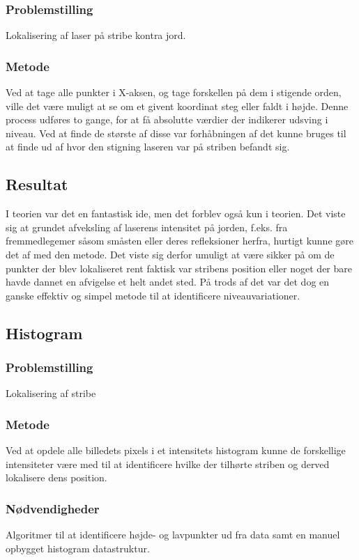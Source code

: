 \subsubsection{Problemstilling}
Lokalisering af laser på stribe kontra jord.

\subsubsection{Metode}
Ved at tage alle punkter i X-aksen, og tage forskellen på dem i stigende orden, ville det være muligt at se om et givent koordinat steg eller faldt i højde.
Denne process udføres to gange, for at få absolutte værdier der indikerer udsving i niveau. Ved at finde de største af disse var forhåbningen af det kunne bruges til at finde ud af hvor den stigning laseren var på striben befandt sig.

\subsection{Resultat}
I teorien var det en fantastisk ide, men det forblev også kun i teorien. Det viste sig at grundet afveksling af laserens intensitet på jorden, f.eks. fra fremmedlegemer såsom småsten eller deres refleksioner herfra, hurtigt kunne gøre det af med den metode.
Det viste sig derfor umuligt at være sikker på om de punkter der blev lokaliseret rent faktisk var stribens position eller noget der bare havde dannet en afvigelse et helt andet sted.
På trods af det var det dog en ganske effektiv og simpel metode til at identificere niveauvariationer.

\subsection{Histogram}

\subsubsection{Problemstilling}
Lokalisering af stribe

\subsubsection{Metode}
Ved at opdele alle billedets pixels i et intensitets histogram kunne de forskellige intensiteter være med til at identificere hvilke der tilhørte striben og derved lokalisere dens position.
\\
\subsubsection{Nødvendigheder}
Algoritmer til at identificere højde- og lavpunkter ud fra data samt en manuel opbygget histogram datastruktur.

